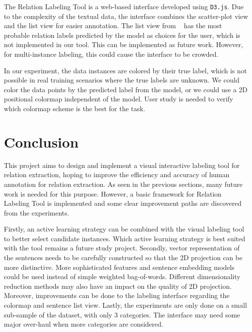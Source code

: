 \documentclass[11pt,a4paper]{article}
\begin{document}
The Relation Labeling Tool is a web-based interface developed using \texttt{D3.js}. Due to the complexity of the textual data, the interface combines the scatter-plot view and the list view for easier annotation. The list view from ~\citet{angeli2014combining} has the most probable relation labels predicted by the model as choices for the user, which is not implemented in our tool. This can be implemented as future work. However, for multi-instance labeling, this could cause the interface to be crowded.

In our experiment, the data instances are colored by their true label, which is not possible in real training scenarios where the true labels are unknown. We could color the data points by the predicted label from the model, or we could use a 2D positional colormap independent of the model. User study is needed to verify which colormap scheme is the best for the task.

\section{Conclusion}

This project aims to design and implement a visual interactive labeling tool for relation extraction, hoping to improve the efficiency and accuracy of human annotation for relation extraction. As seen in the previous sections, many future work is needed for this purpose. However, a basic framework for Relation Labeling Tool is implemented and some clear improvement paths are discovered from the experiments.

Firstly, an active learning strategy can be combined with the visual labeling tool to better select candidate instances. Which active learning strategy is best suited with the tool remains a future study project. Secondly, vector representation of the sentences needs to be carefully constructed so that the 2D projection can be more distinctive. More sophisticated features and sentence embedding models could be used instead of simple weighted bag-of-words. Different dimensionality reduction methods may also have an impact on the quality of 2D projection. Moreover, improvements can be done to the labeling interface regarding the colormap and sentence list view. Lastly, the experiments are only done on a small sub-sample of the dataset, with only 3 categories. The interface may need some major over-haul when more categories are considered.



  
  
  
  
\end{document}
